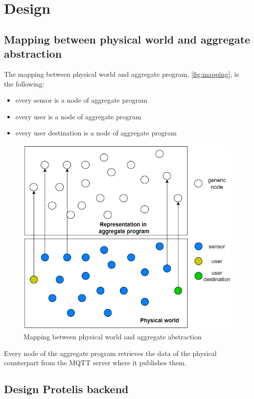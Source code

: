 \chapter{Design}

\section{Mapping between physical world and aggregate abstraction}

The mapping between physical world and aggregate program, \autoref{fig:mapping}, is the following:
\begin{itemize}
    \item every sensor is a node of aggregate program
    \item every user is a node of aggregate program
    \item every user destination is a node of aggregate program
\end{itemize}

\begin{figure}[h]
    \centering
    \includegraphics{images/mapping_physicalWorld_ac.png}
    \caption{Mapping between physical world and aggregate abstraction}
    \label{fig:mapping}
\end{figure}

Every node of the aggregate program retrieves the data of the physical counterpart from the MQTT server where it publishes them.
\clearpage
\section{Design Protelis backend}
